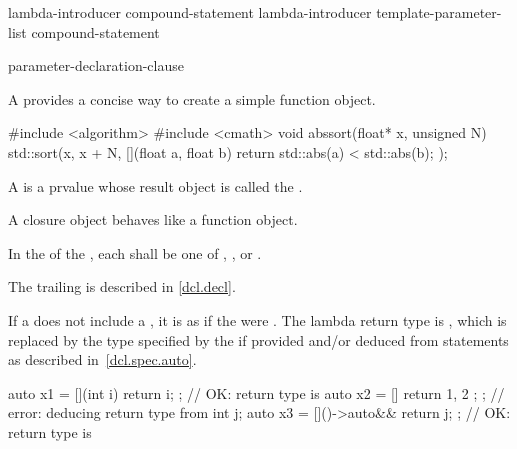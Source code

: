 \begin{bnf}
\br
    lambda-introducer  compound-statement\br
    lambda-introducer \terminal{<} template-parameter-list \terminal{>}   compound-statement
\end{bnf}

\begin{bnf}
\br
    \terminal{[}  \terminal{]}
\end{bnf}

\begin{bnf}
\br
    \terminal{(} parameter-declaration-clause \terminal{)} \br
    \bnfindent{}   
\end{bnf}

\pnum
A  provides
a concise way to create a simple function object.
\begin{example}
\begin{codeblock}
#include <algorithm>
#include <cmath>
void abssort(float* x, unsigned N) {
  std::sort(x, x + N, [](float a, float b) { return std::abs(a) < std::abs(b); });
}
\end{codeblock}
\end{example}

\pnum
A  is a prvalue
whose result object is called the .
\begin{note}
A closure object behaves like a function
object.
\end{note}

\pnum
In the  of the ,
each 
shall be one of , , or .
\begin{note}
The trailing  is described in \ref{dcl.decl}.
\end{note}

\pnum
If a  does not include a
, it is as if the  were
\tcode{()}.
The lambda return type is , which is replaced by the
type specified by the
 if provided and/or deduced from
 statements as described in~\ref{dcl.spec.auto}.
\begin{example}
\begin{codeblock}
auto x1 = [](int i){ return i; };       // OK: return type is 
auto x2 = []{ return { 1, 2 }; };       // error: deducing return type from 
int j;
auto x3 = []()->auto&& { return j; };   // OK: return type is 
\end{codeblock}
\end{example}

